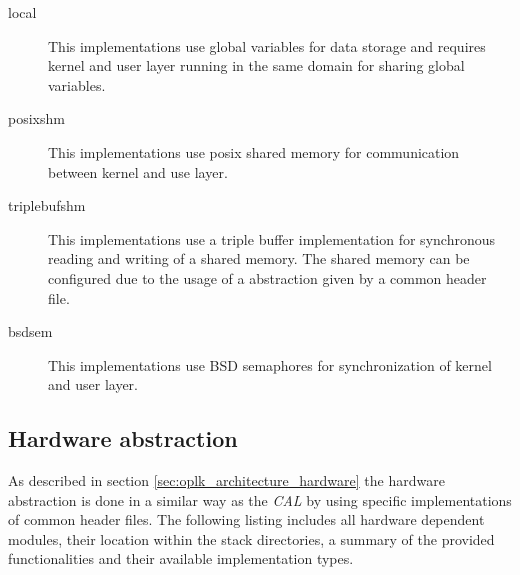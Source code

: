\begin{description}
    \item[local] This implementations use global variables for data storage and requires kernel and user layer running in the same domain for sharing global variables.
    \item[posixshm] This implementations use posix shared memory for communication between kernel and use layer.
    \item[triplebufshm] This implementations use a triple buffer implementation for synchronous reading and writing of a shared memory.
    The shared memory can be configured due to the usage of a abstraction given by a common header file.
    \item[bsdsem] This implementations use BSD semaphores for synchronization of kernel and user layer.
\end{description}



\subsection{Hardware abstraction}
\label{sec:oplk_platform_hardware}

As described in section \ref{sec:oplk_architecture_hardware} the hardware abstraction is done in a similar way as the \emph{CAL} by using specific implementations of common header files.
The following listing includes all hardware dependent modules, their location within the stack directories, a summary of the provided functionalities and their available implementation types.

